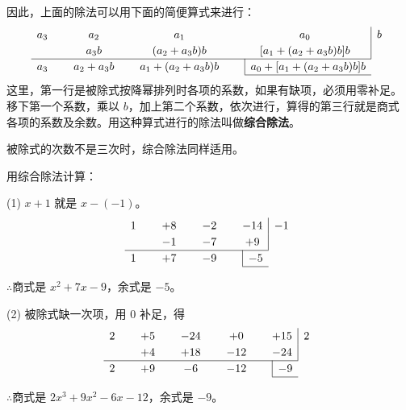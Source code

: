 因此，上面的除法可以用下面的简便算式来进行：
$$
\renewcommand\arraystretch{1.2}
\begin{array}{*{3}{c@{\hspace{0.8cm}}}c|l}
    a_3 & a_2 & a_1 & a_0 & b\\
        & a_3b & (a_2 + a_3b)b & [a_1 + (a_2 + a_3b)b]b & \\
    \cline{1-4}
    a_3 & a_2 + a_3b & a_1 + (a_2 + a_3b)b & \multicolumn{1}{|r}{ a_0 + [a_1 + (a_2 + a_3b)b]b } & \\
    \cline{4-4}
\end{array}
$$
这里，第一行是被除式按降幂排列时各项的系数，如果有缺项，必须用零补足。
移下第一个系数，乘以 $b$，加上第二个系数，依次进行，算得的第三行就是商式
各项的系数及余数。用这种算式进行的除法叫做\textbf{综合除法}。

被除式的次数不是三次时，综合除法同样适用。


\liti 用综合除法计算：
\begin{xiaoxiaotis}



\end{xiaoxiaotis}

\jie (1) $x+1$ 就是 $x - (-1)$。
$$
\renewcommand\arraystretch{1.2}
\begin{array}{*{3}{c@{\hspace{0.8cm}}}c|l}
    1 & +8 & -2 & -14 & -1\\
      & -1 & -7 &  +9 & \\
    \cline{1-4}
    1 & +7 & -9 & \multicolumn{1}{|r}{ -5 } & \\
    \cline{4-4}
\end{array}
$$

$\therefore$\quad 商式是 $x^2 + 7x - 9$，余式是 $-5$。


(2) 被除式缺一次项，用 $0$ 补足，得
$$
\renewcommand\arraystretch{1.2}
\begin{array}{*{4}{c@{\hspace{0.8cm}}}c|l}
    2 & +5 & -24 &  +0 & +15 & 2 \\
      & +4 & +18 & -12 & -24 &   \\
    \cline{1-5}
    2 & +9 &  -6 & -12 & \multicolumn{1}{|r}{ -9 } & \\
    \cline{5-5}
\end{array}
$$

$\therefore$\quad 商式是 $2x^3 + 9x^2 - 6x - 12$，余式是 $-9$。


